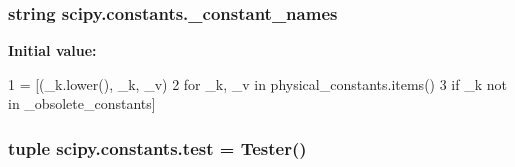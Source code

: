 \subsubsection[{\+\_\+constant\+\_\+names}]{\setlength{\rightskip}{0pt plus 5cm}string scipy.\+constants.\+\_\+constant\+\_\+names}\label{namespacescipy_1_1constants_a391f23b56d1f395ddc55cdf4745095ff}
{\bfseries Initial value\+:}
\begin{DoxyCode}
1 = [(\_k.lower(), \_k, \_v)
2                    \textcolor{keywordflow}{for} \_k, \_v \textcolor{keywordflow}{in} physical\_constants.items()
3                    \textcolor{keywordflow}{if} \_k \textcolor{keywordflow}{not} \textcolor{keywordflow}{in} \_obsolete\_constants]
\end{DoxyCode}
\hypertarget{namespacescipy_1_1constants_aa90d5edfe1580bda302530bfb9b60081}{}
\subsubsection[{test}]{\setlength{\rightskip}{0pt plus 5cm}tuple scipy.\+constants.\+test = Tester()}\label{namespacescipy_1_1constants_aa90d5edfe1580bda302530bfb9b60081}
